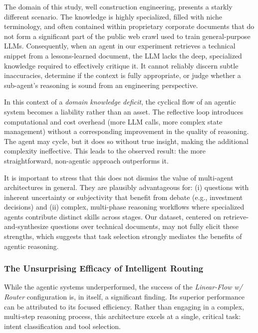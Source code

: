             The domain of this study, well construction engineering, presents a starkly different scenario. The knowledge is highly specialized, filled with niche terminology, and often contained within proprietary corporate documents that do not form a significant part of the public web crawl used to train general-purpose LLMs. Consequently, when an agent in our experiment retrieves a technical snippet from a lessons-learned document, the LLM lacks the deep, specialized knowledge required to effectively critique it. It cannot reliably discern subtle inaccuracies, determine if the context is fully appropriate, or judge whether a sub-agent's reasoning is sound from an engineering perspective.
            
            In this context of a \textit{domain knowledge deficit}, the cyclical flow of an agentic system becomes a liability rather than an asset. The reflective loop introduces computational and cost overhead (more LLM calls, more complex state management) without a corresponding improvement in the quality of reasoning. The agent may cycle, but it does so without true insight, making the additional complexity ineffective. This leads to the observed result: the more straightforward, non-agentic approach outperforms it.

            It is important to stress that this does not dismiss the value of multi-agent architectures in general. They are plausibly advantageous for: (i) questions with inherent uncertainty or subjectivity that benefit from debate (e.g., investment decisions) and (ii) complex, multi-phase reasoning workflows where specialized agents contribute distinct skills across stages. Our dataset, centered on retrieve-and-synthesize questions over technical documents, may not fully elicit these strengths, which suggests that task selection strongly mediates the benefits of agentic reasoning.

        \subsubsection{The Unsurprising Efficacy of Intelligent Routing}
            
            While the agentic systems underperformed, the success of the \textit{Linear-Flow w/ Router} configuration is, in itself, a significant finding. Its superior performance can be attributed to its focused efficiency. Rather than engaging in a complex, multi-step reasoning process, this architecture excels at a single, critical task: intent classification and tool selection.
            

